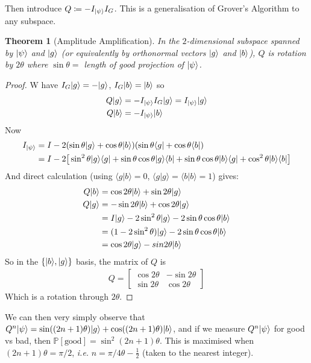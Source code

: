 \documentclass[]{article}
\DeclarePairedDelimiter\bra{\langle}{\rvert}
\DeclarePairedDelimiter\ket{\lvert}{\rangle}
\theoremstyle{custhm}
\theoremstyle{cusdef}
\theoremstyle{custhm}
\theoremstyle{custhm}
\theoremstyle{custhm}
\theoremstyle{custhm}
\newtheorem*{theorem*}{Theorem}
\theoremstyle{cusdef}
\theoremstyle{remark}
\renewcommand{\P}{\mathbb{P}}
\begin{document}
Then introduce $Q\coloneqq -I_{\ket{\psi}}I_G$. This is a generalisation of Grover's Algorithm to any subspace.

\begin{theorem*}[Amplitude Amplification]
	In the $2$-dimensional subspace spanned by $\ket{\psi}$ and $\ket{g}$ (or equivalently by orthonormal vectors $\ket{g}$ and $\ket{b}$), $Q$ is rotation by $2\theta$ where $\sin \theta = $ length of good projection of $\ket{\psi}$.
\end{theorem*}

\begin{proof}
	W have $I_G\ket{g} = - \ket{g}$, $I_G\ket{b} = \ket{b}$ so
	\begin{align*}
		Q\ket{g} &= -I_{\ket{\psi}}I_{G}\ket{g} = I_{\ket{\psi}}\ket{g}\\
		Q\ket{b} &= -I_{\ket{\psi}}\ket{b}
	\end{align*}
	Now
	\begin{align*}
		I_{\ket{\psi}} &= I - 2(\sin\theta\ket{g} + \cos\theta\ket{b})(\sin\theta\bra{g} + \cos\theta\bra{b})\\
		&= I - 2\big[\sin^2\theta \ket{g}\bra{g} + \sin\theta\cos\theta\ket{g}\bra{b}+\sin\theta\cos\theta\ket{b}\bra{g}+\cos^2\theta\ket{b}\bra{b}\big]
	\end{align*}
	And direct calculation (using $\langle g | b \rangle = 0$, $\langle g | g\rangle = \langle b | b \rangle = 1$) gives:
	\begin{align*}
		Q\ket{b} &= \cos2\theta\ket{b} + \sin2\theta \ket{g}\\
		Q\ket{g} &= -\sin2\theta \ket{b} + \cos2\theta \ket{g}\\
		&= I\ket{g} - 2\sin^2\theta\ket{g} - 2\sin\theta\cos\theta \ket{b}\\
		&= (1-2\sin^2\theta)\ket{g} - 2\sin\theta\cos\theta\ket{b}\\
		&= \cos2\theta \ket{g} - sin2\theta \ket{b}
	\end{align*}
	So in the $\{\ket{b},\ket{g}\}$ basis, the matrix of $Q$ is
	\begin{align*}
		Q = \left[\begin{array}{cc} \cos2\theta & -\sin2\theta \\ \sin2\theta & \cos 2\theta \end{array}\right]
	\end{align*}
	Which is a rotation through $2\theta$.
\end{proof}

We can then very simply observe that $Q^n\ket{\psi} = \sin((2n+1)\theta)\ket{g} + \cos((2n+1)\theta)\ket{b}$, and if we measure $Q^n\ket{\psi}$ for good vs bad, then $\P[\textrm{good}] = \sin^2(2n+1)\theta$. This is maximised when $(2n+1)\theta = \pi/2$, \textit{i.e.} $n = \pi/4\theta - \frac{1}{2}$ (taken to the nearest integer).
\end{document}
